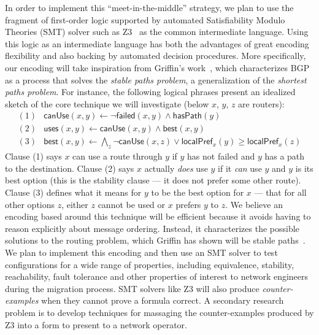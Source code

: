 In order to implement this ``meet-in-the-middle'' strategy, we plan to use the
fragment of first-order logic supported by 
automated Satisfiability Modulo Theories (SMT) solver such as Z3~\cite{z3} as the
common intermediate language.  Using this logic as an intermediate language has both the
advantages of great encoding flexibility and also backing by automated decision procedures.
More specifically, our encoding will take 
inspiration from Griffin's work~\cite{griffin+:stable-paths},
which characterizes BGP as a process that solves the \emph{stable paths problem}, 
a generalization of the  \emph{shortest paths problem}.  
For instance, the following logical phrases present an idealized sketch of the 
core technique we will investigate (below $x$, $y$, $z$ are routers):
%
\newcommand{\pfont}[1]{\mathsf{#1}}%
%
\[
\begin{array}{ll}
(1) & \pfont{canUse}(x,y) \leftarrow \neg \pfont{failed}(x,y) \wedge \pfont{hasPath}(y) \\
(2) & \pfont{uses}(x,y) \leftarrow \pfont{canUse}(x,y) \wedge \pfont{best}(x,y) \\
(3) & \pfont{best}(x,y) \leftarrow \bigwedge_z \neg \pfont{canUse}(x,z) \vee \pfont{localPref}_x(y) \ge \pfont{localPref}_x(z) 
\end{array}
\]
Clause (1) says $x$ can use a route through $y$ if $y$ has not failed and $y$ has a path to the destination. 
Clause (2) says $x$ actually \emph{does}
use $y$ if it \emph{can} use $y$ and $y$ is its best option (this is the stability clause --- it does not prefer some other
route).  Clause (3) defines what it means for $y$ to be the best option for $x$ --- that for all other options $z$, either
$z$ cannot be used or $x$ prefers $y$ to $z$.  We believe an encoding 
based around this technique will be efficient because it avoids having to reason
explicitly about message ordering.  Instead, it characterizes the possible solutions to the routing problem, which Griffin has shown will be stable paths~\cite{griffin+:stable-paths}.
We plan to implement this encoding and then use an SMT solver to test configurations for a wide range of properties, including equivalence, 
stability, reachability, fault tolerance and other properties of interest to network engineers during the
migration process.  SMT solvers like Z3 will also produce \emph{counter-examples} 
when they cannot prove a formula correct. A secondary
research problem is to develop techniques for massaging the counter-examples produced by Z3 into a form to present
to a network operator.  

